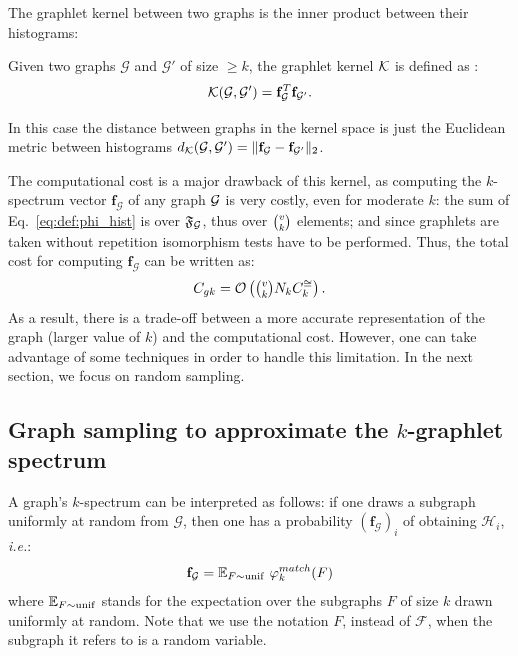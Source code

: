 The graphlet kernel between two graphs is the inner product between their histograms:
\begin{definition}
	Given two graphs $\mathcal{G}$ and $\mathcal{G}'$ of size $\geq k$, the graphlet kernel $\mathcal{K}$ is defined as \citep{graphlet_kernel}:
	\begin{equation}
	\label{eq:graphlet_kernel}
	\mathcal{K}(\mathcal{G},\mathcal{G}')=\mathbf{f}_{\mathcal{G}}^T \mathbf{f}_{\mathcal{G}'}.
	\end{equation}
\end{definition}
In this case the distance between graphs in the kernel space is just the Euclidean metric between histograms $d_{\mathcal{K}}({\mathcal{G}},{\mathcal{G}'}) = \|\mathbf{f}_{\mathcal{G}} - \mathbf{f}_{{\mathcal{G}'}}\|_2$. 

The computational cost is a major drawback of this kernel, as computing the $k$-spectrum vector $\mathbf{f}_{\mathcal{G}}$ of any graph $\mathcal{G}$ is very costly, even for moderate $k$: the sum of Eq.~\eqref{eq:def:phi_hist} is over $\mathfrak{F}_{\mathcal{G}}$, thus over $\tbinom{v}{k}$ elements; and since graphlets are taken without repetition isomorphism tests have to be performed. Thus, the total cost for computing $\mathbf{f}_{\mathcal{G}}$ can be written as:
\begin{equation}
\label{eq:cost_graphlet}
C_{gk}= \mathcal{O}\left(\tbinom{v}{k} N_k C^{\cong}_k\right).
\end{equation}
As a result, there is a trade-off between a more accurate representation of the graph (larger value of $k$) and the computational cost. However, one can take advantage of some techniques in order to handle this limitation. In the next section, we focus on random sampling.

\subsection{Graph sampling to approximate the $k$-graphlet spectrum}
\label{graph_sampling}

A graph's $k$-spectrum can be interpreted as follows: if one draws a subgraph uniformly at random from $\mathcal{G}$, then one has a probability $(\mathbf{f}_\mathcal{G})_i$ of obtaining $\mathcal{H}_i$, \emph{i.e.}:
\begin{align}
	\label{eq:histo_unif}
	\mathbf{f}_\mathcal{G} = \mathbb{E}_{F \sim {\rm unif}} ~\varphi^{match}_k(F)
\end{align}
where $\mathbb{E}_{F \sim {\rm unif}}$ stands for the expectation over the subgraphs $F$ of size $k$ drawn uniformly at random. Note that we use the notation $F$, instead of $\mathcal{F}$, when the subgraph it refers to is a random variable. 

